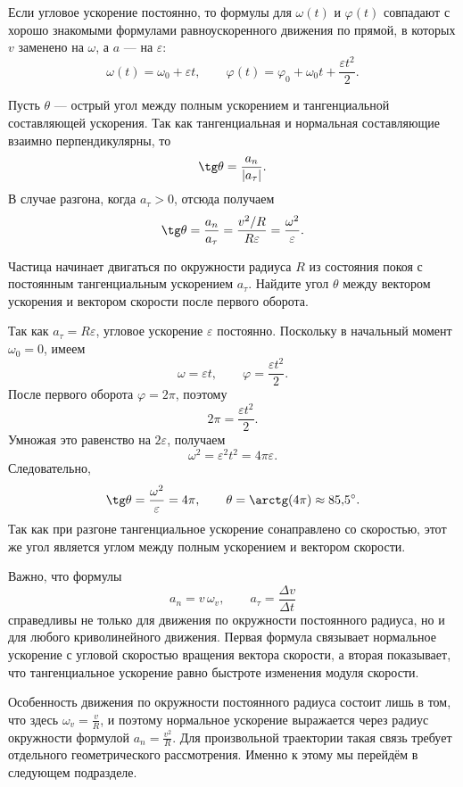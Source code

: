 \documentclass[../main.tex]{subfiles}
\begin{document}
Если угловое ускорение постоянно, то
формулы для $\omega(t)$ и $\varphi(t)$ совпадают с хорошо знакомыми формулами
равноускоренного движения по прямой, в которых $v$ заменено на $\omega$,
а $a$ --- на $\varepsilon$:
\[
\omega(t) = \omega_0 + \varepsilon t,
\qquad
\varphi(t) = \varphi_0 + \omega_0 t + \frac{\varepsilon t^2}{2}.
\]

Пусть $\theta$ --- острый угол между полным ускорением и тангенциальной
составляющей ускорения. Так как тангенциальная и нормальная составляющие
взаимно перпендикулярны, то
\[
\tg\theta = \frac{a_n}{|a_\tau|}.
\]
В случае разгона, когда $a_\tau > 0$, отсюда получаем
\[
\tg\theta = \frac{a_n}{a_\tau}
= \frac{v^2/R}{R\varepsilon}
= \frac{\omega^2}{\varepsilon}.
\]

\begin{example}
Частица начинает двигаться по окружности радиуса $R$ из состояния
покоя с постоянным тангенциальным ускорением $a_\tau$.
Найдите угол $\theta$ между вектором ускорения и вектором скорости
после первого оборота.

Так как $a_\tau = R\varepsilon$, угловое ускорение $\varepsilon$ постоянно.
Поскольку в начальный момент $\omega_0 = 0$, имеем
\[
\omega = \varepsilon t,
\qquad
\varphi = \frac{\varepsilon t^2}{2}.
\]
После первого оборота $\varphi = 2\pi$, поэтому
\[
2\pi = \frac{\varepsilon t^2}{2}.
\]
Умножая это равенство на $2\varepsilon$, получаем
\[
\omega^2 = \varepsilon^2 t^2 = 4\pi\varepsilon.
\]
Следовательно,
\[
\tg\theta = \frac{\omega^2}{\varepsilon} = 4\pi,
\qquad
\theta = \arctg(4\pi) \approx 85{,}5^\circ.
\]
Так как при разгоне тангенциальное ускорение сонаправлено со скоростью,
этот же угол является углом между полным ускорением и вектором скорости.
\end{example}

Важно, что формулы
\[
a_n = v\,\omega_v,
\qquad
a_\tau = \frac{\Delta v}{\Delta t}
\]
справедливы не только для движения по окружности постоянного радиуса,
но и для любого криволинейного движения. Первая формула связывает
нормальное ускорение с угловой скоростью вращения вектора скорости,
а вторая показывает, что тангенциальное ускорение равно быстроте
изменения модуля скорости.

Особенность движения по окружности постоянного радиуса состоит лишь в том, что здесь
$\omega_v = \frac{v}{R}$, и поэтому нормальное ускорение выражается через
радиус окружности формулой $a_n = \frac{v^2}{R}$. Для произвольной
траектории такая связь требует отдельного геометрического рассмотрения.
Именно к этому мы перейдём в следующем подразделе.
\end{document}
